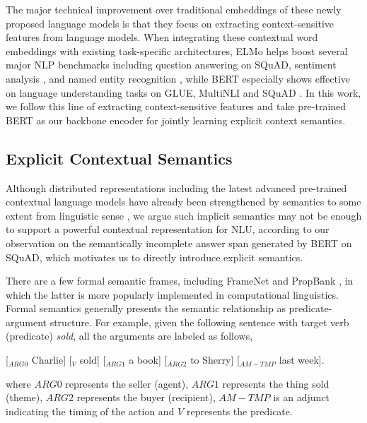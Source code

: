 \documentclass[letterpaper]{article} \usepackage{aaai20}  \usepackage{times}  \usepackage{helvet} \usepackage{courier}  \usepackage[hyphens]{url}  \usepackage{graphicx} \urlstyle{rm} \def\UrlFont{\rm}  \usepackage{graphicx}  \frenchspacing  \usepackage{amssymb}
\begin{document}
The major technical improvement over traditional embeddings of these newly proposed language models is that they focus on extracting context-sensitive features from language models. When integrating these contextual word embeddings with existing task-specific architectures, ELMo helps boost several major NLP benchmarks \cite{Peters2018ELMO} including question answering on SQuAD, sentiment analysis \cite{socher2013recursive}, and named entity recognition \cite{sang2003introduction}, while BERT especially shows effective on language understanding tasks on GLUE, MultiNLI and SQuAD \cite{devlin2018bert}. In this work, we follow this line of extracting context-sensitive features and take pre-trained BERT as our backbone encoder for jointly learning explicit context semantics.

\subsection{Explicit Contextual Semantics}
Although distributed representations including the latest advanced pre-trained contextual language models have already been strengthened by semantics to some extent from linguistic sense \cite{clark2019does}, we argue such implicit semantics may not be enough to support a powerful contextual representation for NLU, according to our observation on the semantically incomplete answer span generated by BERT on SQuAD, which motivates us to directly introduce explicit semantics.

There are a few formal semantic frames, including FrameNet \cite{baker1998berkeley} and PropBank \cite{palmer2005proposition}, in which the latter is more popularly implemented in computational linguistics. Formal semantics generally presents the semantic relationship as predicate-argument structure. For example, given the following sentence with target verb (predicate) \emph{sold}, all the arguments are labeled as follows, 

[$_{ARG0}$ Charlie] [$_{V}$ sold] [$_{ARG1}$ a book] [$_{ARG2}$ to Sherry] [$_{AM-TMP}$ last week].

\noindent where $ARG0$ represents the  seller (agent), $ARG1$ represents the thing sold (theme), $ARG2$ represents the buyer (recipient), $AM-TMP$ is an adjunct indicating the timing of the action and $V$ represents the predicate.
\end{document}
